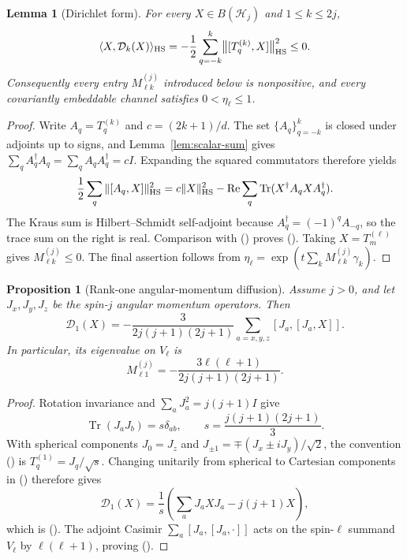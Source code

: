 \documentclass[twoside,10pt]{article}
\numberwithin{equation}{section}
\theoremstyle{slbody}
\newtheorem{proposition}[theorem]{Proposition}
\newtheorem{lemma}[theorem]{Lemma}
\theoremstyle{definition}
\theoremstyle{remark}
\newcommand{\Tr}{\operatorname{Tr}}
\newcommand{\cD}{\mathcal D}
\renewcommand{\eqref}[1]{%
  \textup{{\normalfont(\oldstylenums{\ref{#1}}}\normalfont)}}
\begin{document}
\begin{lemma}[Dirichlet form]\label{lem:dirichlet-form}
For every \(X\in B(\mathcal H_j)\) and \(1\leq k\leq2j\),
\begin{equation}\label{eq:dirichlet-form}
 \langle X,\cD_k(X)\rangle_{\rm HS}
 =-\frac12\sum_{q=-k}^k
 \bigl\|[T_q^{(k)},X]\bigr\|_{\rm HS}^2\leq0.
\end{equation}
Consequently every entry \(M^{(j)}_{\ell k}\) introduced below is
nonpositive, and every covariantly embeddable channel satisfies
\(0<\eta_\ell\leq1\).
\end{lemma}

\begin{proof}
Write \(A_q=T_q^{(k)}\) and \(c=(2k+1)/d\).  The set
\(\{A_q\}_{q=-k}^k\) is closed under adjoints up to signs, and
Lemma~\ref{lem:scalar-sum} gives
\(\sum_qA_q^\dagger A_q=\sum_qA_qA_q^\dagger=cI\).  Expanding the
squared commutators therefore yields
\begin{equation*}
 \frac12\sum_q\|[A_q,X]\|_{\rm HS}^2
 =c\|X\|_{\rm HS}^2
 -\operatorname{Re}\sum_q\Tr(X^\dagger A_qXA_q^\dagger).
\end{equation*}
The Kraus sum is Hilbert--Schmidt self-adjoint because
\(A_q^\dagger=(-1)^qA_{-q}\), so the trace sum on the right is real.
Comparison with \eqref{eq:dissipator-simplified} proves
\eqref{eq:dirichlet-form}.  Taking \(X=T_m^{(\ell)}\) gives
\(M^{(j)}_{\ell k}\leq0\).  The final assertion follows from
\(\eta_\ell=\exp(t\sum_kM^{(j)}_{\ell k}\gamma_k)\).
\end{proof}

\begin{proposition}[Rank-one angular-momentum diffusion]
\label{prop:rank-one-diffusion}
Assume \(j>0\), and let \(J_x,J_y,J_z\) be the spin-\(j\) angular
momentum operators.  Then
\begin{equation}\label{eq:D-one-double-commutator}
 \cD_1(X)=-\frac{3}{2j(j+1)(2j+1)}
 \sum_{a=x,y,z}[J_a,[J_a,X]].
\end{equation}
In particular, its eigenvalue on \(V_\ell\) is
\begin{equation}\label{eq:M-first-column}
 M^{(j)}_{\ell1}
 =-\frac{3\ell(\ell+1)}{2j(j+1)(2j+1)}.
\end{equation}
\end{proposition}

\begin{proof}
Rotation invariance and
\(\sum_aJ_a^2=j(j+1)I\) give
\begin{equation*}
 \Tr(J_aJ_b)=s\delta_{ab},
 \qquad s=\frac{j(j+1)(2j+1)}3.
\end{equation*}
With spherical components
\(J_0=J_z\) and
\(J_{\pm1}=\mp(J_x\pm iJ_y)/\sqrt2\), the convention
\eqref{eq:tensor-definition} is \(T_q^{(1)}=J_q/\sqrt s\).
Changing unitarily from spherical to Cartesian components in
\eqref{eq:dissipator-simplified} therefore gives
\begin{equation*}
 \cD_1(X)=\frac1s\left(\sum_aJ_aXJ_a-j(j+1)X\right),
\end{equation*}
which is \eqref{eq:D-one-double-commutator}.  The adjoint Casimir
\(\sum_a[J_a,[J_a,\cdot]]\) acts on the spin-\(\ell\) summand
\(V_\ell\) by \(\ell(\ell+1)\), proving
\eqref{eq:M-first-column}.
\end{proof}
\end{document}
